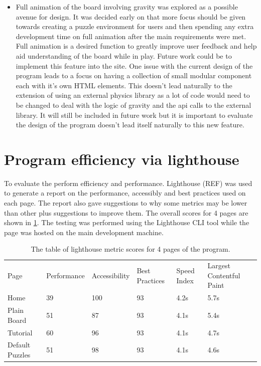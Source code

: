 \documentclass{l4proj}
\begin{document}
\begin{itemize}
    \item Full animation of the board involving gravity was explored as a possible avenue for design. It was decided early on that more focus should be given towards creating a puzzle environment for users and then spending any extra development time on full animation after the main requirements were met. Full animation is a desired function to greatly improve user feedback and help aid understanding of the board while in play. Future work could be to implement this feature into the site. One issue with the current design of the program leads to a focus on having a collection of small modular component each with it's own HTML elements. This doesn't lead naturally to the extension of using an external physics library as a lot of code would need to be changed to deal with the logic of gravity and the api calls to the external library. It will still be included in future work but it is important to evaluate the design of the program doesn't lead itself naturally to this new feature.
\end{itemize}

\section{Program efficiency via lighthouse}
To evaluate the perform efficiency and performance. Lighthouse (REF) was used to generate a report on the performance, accessibly and best practices used on each page. The report also gave suggestions to why some metrics may be lower than other plus suggestions to improve them. The overall scores for 4 pages are shown in \ref{tab:lighthouse}. The testing was performed using the Lighthouse CLI tool while the page was hosted on the main development machine. 

\begin{table}[]
    \caption{The table of lighthouse metric scores for 4 pages of the program.}\label{tab:lighthouse}
    \begin{tabular}{llllll}
        Page            & Performance & Accessibility & Best Practices & Speed Index & Largest Contentful Paint \\
        Home            & 39          & 100           & 93             & 4.2s        & 5.7s                     \\
        Plain Board     & 51          & 87            & 93             & 4.1s        & 5.4s                     \\
        Tutorial        & 60          & 96            & 93             & 4.1s        & 4.7s                     \\
        Default Puzzles & 51          & 98            & 93             & 4.1s        & 4.6s                    
    \end{tabular}
\end{table}
\end{document}
